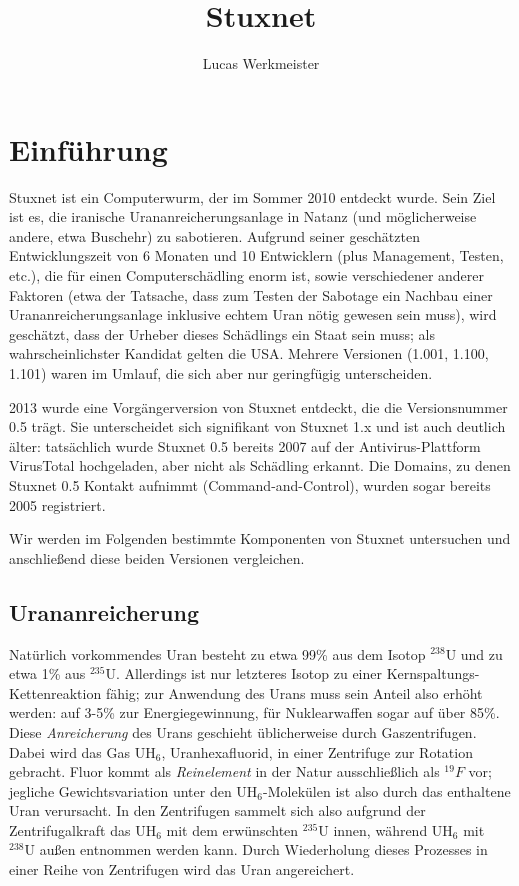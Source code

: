 \documentclass{article}
\title{Stuxnet}
\author{Lucas Werkmeister}
\begin{document}
\maketitle

\section{Einführung}

Stuxnet ist ein Computerwurm, der im Sommer 2010 entdeckt wurde.
Sein Ziel ist es, die iranische Urananreicherungsanlage in Natanz (und möglicherweise andere, etwa Buschehr) zu sabotieren.
Aufgrund seiner geschätzten Entwicklungszeit von 6 Monaten und 10 Entwicklern (plus Management, Testen, etc.),
die für einen Computerschädling enorm ist, sowie verschiedener anderer Faktoren
(etwa der Tatsache, dass zum Testen der Sabotage ein Nachbau einer Urananreicherungsanlage inklusive echtem Uran nötig gewesen sein muss),
wird geschätzt, dass der Urheber dieses Schädlings ein Staat sein muss;
als wahrscheinlichster Kandidat gelten die USA.
Mehrere Versionen (1.001, 1.100, 1.101) waren im Umlauf, die sich aber nur geringfügig unterscheiden.

2013 wurde eine Vorgängerversion von Stuxnet entdeckt, die die Versionsnummer 0.5 trägt.
Sie unterscheidet sich signifikant von Stuxnet 1.x und ist auch deutlich älter:
tatsächlich wurde Stuxnet 0.5 bereits 2007 auf der Antivirus-Plattform VirusTotal hochgeladen, aber nicht als Schädling erkannt.
Die Domains, zu denen Stuxnet 0.5 Kontakt aufnimmt (Command-and-Control), wurden sogar bereits 2005 registriert.

Wir werden im Folgenden bestimmte Komponenten von Stuxnet untersuchen und anschließend diese beiden Versionen vergleichen.

\subsection{Urananreicherung}

Natürlich vorkommendes Uran besteht zu etwa 99\% aus dem Isotop $^{238}\mathrm U$ und zu etwa 1\% aus $^{235}\mathrm U$.
Allerdings ist nur letzteres Isotop zu einer Kernspaltungs-Kettenreaktion fähig;
zur Anwendung des Urans muss sein Anteil also erhöht werden: auf 3-5\% zur Energiegewinnung, für Nuklearwaffen sogar auf über 85\%.
Diese \emph{Anreicherung} des Urans geschieht üblicherweise durch Gaszentrifugen.
Dabei wird das Gas $\mathrm{UH}_6$, Uranhexafluorid, in einer Zentrifuge zur Rotation gebracht.
Fluor kommt als \emph{Reinelement} in der Natur ausschließlich als $^{19}F$ vor;
jegliche Gewichtsvariation unter den $\mathrm{UH}_6$-Molekülen ist also durch das enthaltene Uran verursacht.
In den Zentrifugen sammelt sich also aufgrund der Zentrifugalkraft das $\mathrm{UH}_6$ mit dem erwünschten $^{235}\mathrm U$ innen,
während $\mathrm{UH}_6$ mit $^{238}\mathrm U$ außen entnommen werden kann.
Durch Wiederholung dieses Prozesses in einer Reihe von Zentrifugen wird das Uran angereichert.
\end{document}
